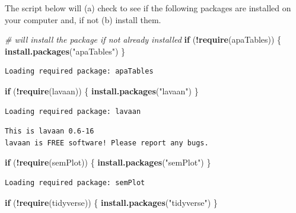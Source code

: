 \documentclass[
  11pt,
]{book}
\newenvironment{Shaded}{\begin{snugshade}}{\end{snugshade}}
\newcommand{\CommentTok}[1]{\textcolor[rgb]{0.37,0.37,0.37}{\textit{#1}}}
\newcommand{\ControlFlowTok}[1]{\textcolor[rgb]{0.27,0.27,0.27}{\textbf{#1}}}
\newcommand{\FunctionTok}[1]{\textcolor[rgb]{0.27,0.27,0.27}{\textbf{#1}}}
\newcommand{\NormalTok}[1]{#1}
\newcommand{\SpecialCharTok}[1]{\textcolor[rgb]{0.43,0.43,0.43}{\textbf{#1}}}
\newcommand{\StringTok}[1]{\textcolor[rgb]{0.5,0.5,0.5}{#1}}
\begin{document}
The script below will (a) check to see if the following packages are installed on your computer and, if not (b) install them.

\begin{Shaded}
\begin{Highlighting}[]
\CommentTok{\# will install the package if not already installed}
\ControlFlowTok{if}\NormalTok{ (}\SpecialCharTok{!}\FunctionTok{require}\NormalTok{(apaTables)) \{}
    \FunctionTok{install.packages}\NormalTok{(}\StringTok{"apaTables"}\NormalTok{)}
\NormalTok{\}}
\end{Highlighting}
\end{Shaded}

\begin{verbatim}
Loading required package: apaTables
\end{verbatim}

\begin{Shaded}
\begin{Highlighting}[]
\ControlFlowTok{if}\NormalTok{ (}\SpecialCharTok{!}\FunctionTok{require}\NormalTok{(lavaan)) \{}
    \FunctionTok{install.packages}\NormalTok{(}\StringTok{"lavaan"}\NormalTok{)}
\NormalTok{\}}
\end{Highlighting}
\end{Shaded}

\begin{verbatim}
Loading required package: lavaan
\end{verbatim}

\begin{verbatim}
This is lavaan 0.6-16
lavaan is FREE software! Please report any bugs.
\end{verbatim}

\begin{Shaded}
\begin{Highlighting}[]
\ControlFlowTok{if}\NormalTok{ (}\SpecialCharTok{!}\FunctionTok{require}\NormalTok{(semPlot)) \{}
    \FunctionTok{install.packages}\NormalTok{(}\StringTok{"semPlot"}\NormalTok{)}
\NormalTok{\}}
\end{Highlighting}
\end{Shaded}

\begin{verbatim}
Loading required package: semPlot
\end{verbatim}

\begin{Shaded}
\begin{Highlighting}[]
\ControlFlowTok{if}\NormalTok{ (}\SpecialCharTok{!}\FunctionTok{require}\NormalTok{(tidyverse)) \{}
    \FunctionTok{install.packages}\NormalTok{(}\StringTok{"tidyverse"}\NormalTok{)}
\NormalTok{\}}
\end{Highlighting}
\end{Shaded}
\end{document}
